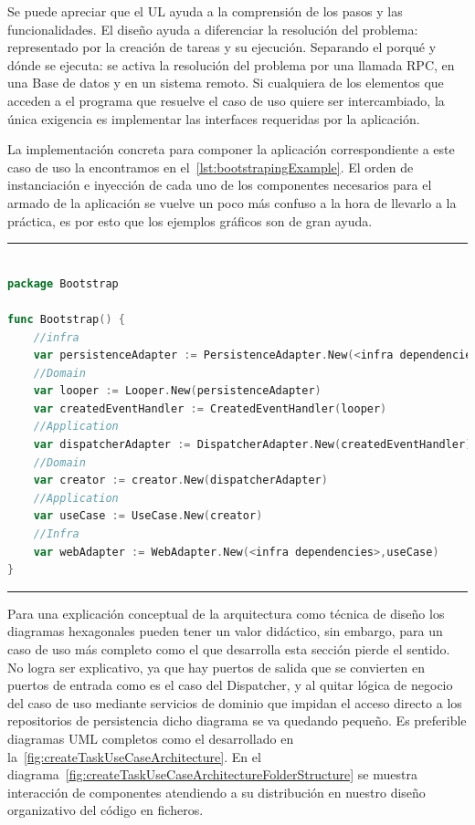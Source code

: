 Se puede apreciar que el UL ayuda a la comprensión de los pasos y las funcionalidades.
El diseño ayuda a diferenciar la resolución del problema: representado por la creación de tareas y su ejecución.
Separando el porqué y dónde se ejecuta: se activa la resolución del problema por una llamada RPC, en una Base de datos y en un sistema remoto.
Si cualquiera de los elementos que acceden a el programa que resuelve el caso de uso quiere ser intercambiado, la única exigencia es implementar las interfaces requeridas por la aplicación.

La implementación concreta para componer la aplicación correspondiente a este caso de uso la encontramos en el~\cref{lst:bootstrapingExample}.
El orden de instanciación e inyección de cada uno de los componentes necesarios para el armado de la aplicación se vuelve un poco más confuso a la hora de llevarlo a la práctica, es por esto que los ejemplos gráficos son de gran ayuda.

\phantom{blank}
\vspace{10mm}
\hrule
\begin{lstlisting}[language=Go,caption={Ejemplo de \textit{Bootstraping} del sistema },breaklines=true,label={lst:bootstrapingExample}]

package Bootstrap

func Bootstrap() {
    //infra
    var persistenceAdapter := PersistenceAdapter.New(<infra dependencies>)
    //Domain
    var looper := Looper.New(persistenceAdapter)
    var createdEventHandler := CreatedEventHandler(looper)
    //Application
    var dispatcherAdapter := DispatcherAdapter.New(createdEventHandler)
    //Domain
    var creator := creator.New(dispatcherAdapter)
    //Application
    var useCase := UseCase.New(creator)
    //Infra
    var webAdapter := WebAdapter.New(<infra dependencies>,useCase)
}

\end{lstlisting}
\hrule

Para una explicación conceptual de la arquitectura como técnica de diseño los diagramas hexagonales pueden tener un valor didáctico, sin embargo, para un caso de uso más completo como el que desarrolla esta sección pierde el sentido.
No logra ser explicativo, ya que hay puertos de salida que se convierten en puertos de entrada como es el caso del Dispatcher, y al quitar lógica de negocio del caso de uso mediante servicios de dominio que impidan el acceso directo a los repositorios de persistencia dicho diagrama se va quedando pequeño.
Es preferible diagramas UML completos como el desarrollado en la~\cref{fig:createTaskUseCaseArchitecture}.
En el diagrama~\cref{fig:createTaskUseCaseArchitectureFolderStructure} se muestra interacción de componentes atendiendo a su distribución en nuestro diseño organizativo del código en ficheros.

